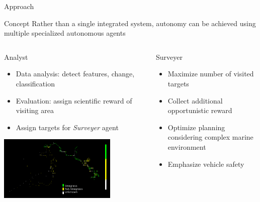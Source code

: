 \documentclass[9pt]{beamer}
\begin{document}
\begin{frame}{Approach}
    \begin{block}{Concept}
        Rather than a single integrated system, autonomy can be achieved using multiple specialized autonomous agents
    \end{block}
    \begin{columns}
        \begin{column}{0.33\textwidth}
            \begin{block}{Analyst}
                \begin{center}
                    \begin{itemize}
    	                \item Data analysis: detect features, change, classification
        	            \item Evaluation: assign scientific reward of visiting area 
                        \item Assign targets for \textit{Surveyer} agent
                    \end{itemize}
                    \includegraphics[width=0.75\textwidth,trim={6cm .5cm 4cm .5cm},clip]{img/seagrass.png}
                \end{center}
            \end{block}
        \end{column}
        \begin{column}{0.33\textwidth}
            \begin{block}{Surveyer}
                \begin{center}
                    \begin{itemize}
    	                \item Maximize number of visited targets
        	            \item Collect additional opportunistic reward
                        \item Optimize planning considering complex marine environment
                        \item Emphasize vehicle safety

\end{itemize}
\end{center}
\end{block}
\end{column}
\end{columns}
\end{frame}
\end{document}

